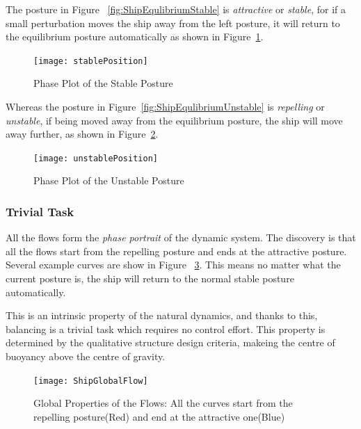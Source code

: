 The posture in Figure ~\ref{fig:ShipEqulibriumStable} is \emph{attractive} or \emph{stable},
for if a small perturbation moves the ship away from the left posture, it will return to the equilibrium posture automatically as shown in Figure~\ref{fig:StablePosture}.
\begin{figure}[!htbp]
  \begin{center}
      \texttt{[image: stablePosition]}
    \caption{Phase Plot of the Stable Posture}
    \label{fig:StablePosture}
  \end{center}
\end{figure}


Whereas the  posture in Figure~\ref{fig:ShipEqulibriumUnstable} is \emph{repelling} or \emph{unstable}, if being moved away from the equilibrium posture, the ship will move away further, as shown in Figure~\ref{fig:unStablePosture}.

\begin{figure}[!htbp]
  \begin{center}
      \texttt{[image: unstablePosition]}
    \caption{Phase Plot of the Unstable Posture}
    \label{fig:unStablePosture}
  \end{center}
\end{figure}


\subsubsection*{Trivial Task}
All the flows form the \emph{phase portrait} of the dynamic system. 
The discovery is that all the flows start from the repelling posture and ends at the attractive posture.
Several example curves are show in Figure ~\ref{fig:globalflow}.
This means no matter what the current posture is, the ship will return to the normal stable posture automatically.

This is an intrinsic property of the natural dynamics, and thanks to this, balancing is a trivial task which requires no control effort. 
This property is determined by the qualitative structure design criteria, makeing the centre of buoyancy  above the centre of gravity.

\begin{figure}[!htbp]
  \begin{center}
   \texttt{[image: ShipGlobalFlow]}
   \caption{Global Properties of the Flows: All the curves start from the repelling posture(Red) and end at the attractive one(Blue)}
   \label{fig:globalflow}
  \end{center}
\end{figure}

